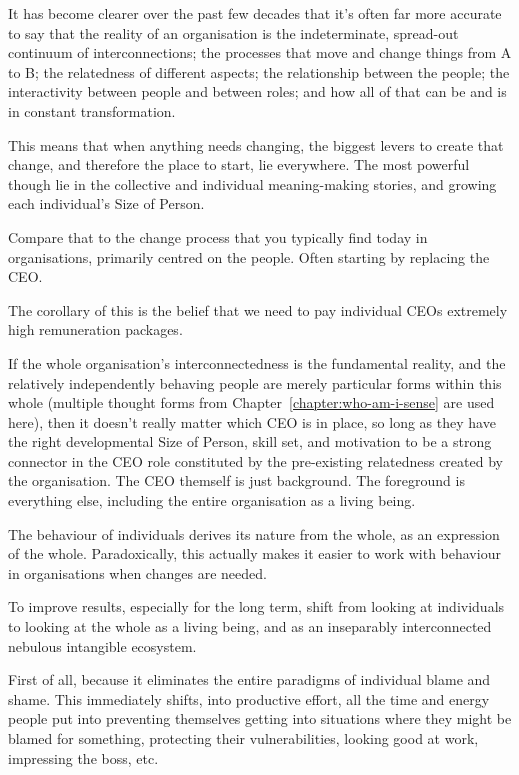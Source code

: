 It has become clearer over the past few decades that it's often far more accurate to say that the reality of an organisation is the indeterminate, spread-out continuum of interconnections; the processes that move and change things from A to B; the relatedness of different aspects; the relationship between the people; the interactivity between people and between roles; and how all of that can be and is in constant transformation.


This means that when anything needs changing, the biggest levers to create that change, and therefore the place to start, lie everywhere. The most powerful though lie in the collective and individual meaning\hyp{}making stories, and growing each individual’s  Size of Person. 


Compare that to the change process that you typically find today in organisations, primarily centred on the people. Often starting by replacing the CEO.


The corollary of this is the belief that we need to pay individual CEOs extremely high remuneration packages.


If the whole organisation’s interconnectedness is the fundamental reality, and the relatively independently behaving people are merely particular forms within this whole (multiple thought forms from Chapter~\ref{chapter:who-am-i-sense} are used here), then it doesn't really matter which CEO is in place, so long as they have the right developmental Size of Person, skill set, and motivation to be a strong connector in the CEO role constituted by the pre-existing relatedness created by the organisation. The CEO themself is just background. The foreground is everything else, including the entire organisation as a living being. 


The behaviour of individuals derives its nature from the whole, as an expression of the whole. Paradoxically, this actually makes it easier to work with behaviour in organisations when changes are needed. 


To improve results, especially for the long term, shift from looking at individuals to looking at the whole as a living being, and as an inseparably interconnected nebulous intangible ecosystem. 


First of all, because it eliminates the entire paradigms of individual blame and shame. This immediately shifts, into productive effort, all the time and energy people put into preventing themselves getting into situations where they might be blamed for something, protecting their vulnerabilities, looking good at work, impressing the boss, etc. 


